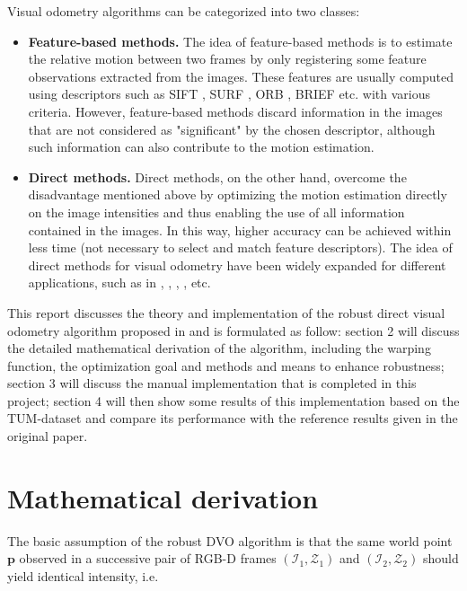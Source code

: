 \documentclass[acmsmall, nonacm, 11pt]{acmart}
\begin{document}
Visual odometry algorithms can be categorized into two classes:
\begin{itemize}
    \item \textbf{Feature-based methods.} The idea of feature-based methods is to estimate the relative motion between two frames by only registering some feature observations extracted from the images. These features are usually computed using descriptors such as SIFT \cite{lowe1999object}, SURF \cite{bay2006surf}, ORB \cite{rublee2011orb}, BRIEF \cite{calonder2010brief} etc. with various criteria. However, feature-based methods discard information in the images that are not considered as "significant" by the chosen descriptor, although such information can also contribute to the motion estimation.
    \item \textbf{Direct methods.} Direct methods, on the other hand, overcome the disadvantage mentioned above by optimizing the motion estimation directly on the image intensities and thus enabling the use of all information contained in the images. In this way, higher accuracy can be achieved within less time (not necessary to select and match feature descriptors). The idea of direct methods for visual odometry have been widely expanded for different applications, such as in \cite{steinbrucker2011real}, \cite{stuhmer2010real}, \cite{newcombe2011dtam}, \cite{engel2014lsd}, \cite{engel2017direct} etc.
\end{itemize}

This report discusses the theory and implementation of the robust direct visual odometry algorithm proposed in \cite{kerl2013robust} and is formulated as follow: section 2 will discuss the detailed mathematical derivation of the algorithm, including the warping function, the optimization goal and methods and means to enhance robustness; section 3 will discuss the manual implementation that is completed in this project; section 4 will then show some results of this implementation based on the TUM-dataset and compare its performance with the reference results given in the original paper.

\section{Mathematical derivation}
The basic assumption of the robust DVO algorithm is that the same world point $\mathbf{p}$ observed in a successive pair of RGB-D frames $(\mathcal{I}_1, \mathcal{Z}_1)$ and $(\mathcal{I}_2, \mathcal{Z}_2)$ should yield identical intensity, i.e. 
\end{document}
